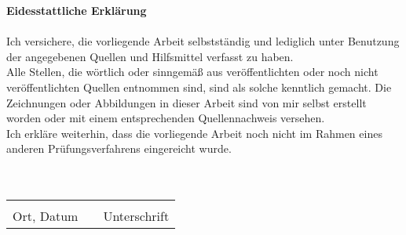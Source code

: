 {\huge \textbf{Eidesstattliche Erklärung}} \\ \\
Ich versichere, die vorliegende Arbeit selbstständig und lediglich unter Benutzung der angegebenen Quellen und Hilfsmittel verfasst zu haben. \\

Alle Stellen, die wörtlich oder sinngemäß aus veröffentlichten oder noch nicht veröffentlichten Quellen entnommen sind, sind als solche kenntlich gemacht. Die Zeichnungen oder Abbildungen in dieser Arbeit sind von mir selbst erstellt worden oder mit einem entsprechenden Quellennachweis versehen. \\

Ich erkläre weiterhin, dass die vorliegende Arbeit noch nicht im Rahmen eines anderen Prüfungsverfahrens eingereicht wurde. \\ \\ \\

\begin{center}
	\vspace{1.5cm}
	\begin{tabular}{lp{2em}l}
		\hspace{5cm}   && \hspace{5cm} \\
		\cline{1-1}\cline{3-3}
		Ort, Datum  && \hfill Unterschrift
	\end{tabular} 
\end{center}

\newpage